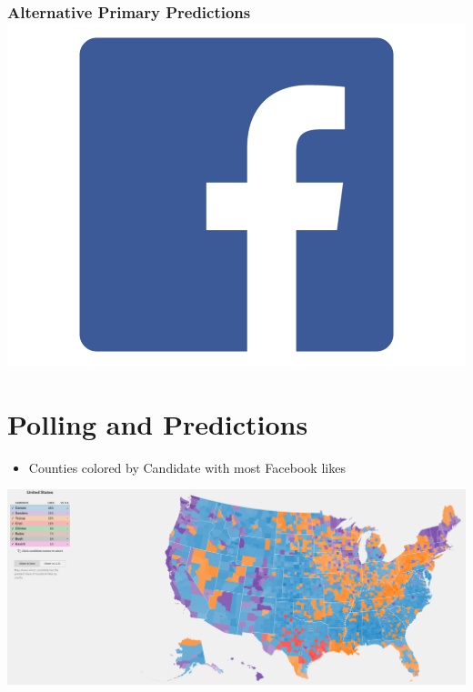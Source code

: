 \documentclass[xcolor=dvipsnames]{beamer}
\begin{document}
\begin{frame}
\frametitle{Alternative Primary Predictions \hfill \includegraphics[scale=.035]{facebook.png}}
\section{Polling and Predictions}
\begin{itemize}
\item Counties colored by Candidate with most Facebook likes 
\end{itemize}
\begin{center}

\includegraphics[scale=.14]{allmap.png}
\end{center}
\end{frame}
%
%
%
\end{document}
